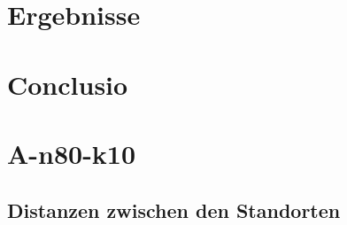 \documentclass{IEEEtran}
\begin{document}
\section{Ergebnisse}


\section{Conclusio}

\printbibliography


\appendix
\section{A-n80-k10}
\subsection{Distanzen zwischen den Standorten}
\end{document}
